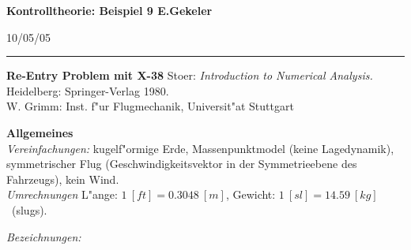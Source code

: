 \documentclass[12pt,a4paper,twoside,leqno]{article}
\newcommand{\Release}{10/05/05} %
\begin{document}
{\large\bf Kontrolltheorie: Beispiel 9 \hfill E.Gekeler}
\par
\vspace{-0.5ex}
\hfill{\footnotesize\Release\ }
\par\hrule\par\vspace{2ex}
\bc
{\bf Re-Entry Problem mit X-38}
\ec
{\sc Stoer:} {\sl Introduction to Numerical Analysis.}
Heidelberg: Springer-Verlag 1980.\\
{\sc W. Grimm:} Inst. f"ur Flugmechanik, Universit"at Stuttgart\\
\par\vspace{1ex}
{\bf Allgemeines}\\
{\em Vereinfachungen:} kugelf"ormige Erde, Massenpunktmodel (keine Lagedynamik),
symmetrischer Flug (Geschwindigkeitsvektor in der Symmetrieebene des Fahrzeugs),
kein Wind.\\
{\em Umrechnungen} L"ange: $1 \ [ft] = 0.3048 \ [m]$, Gewicht:
$1\ [sl]  =  14.59\ [kg] $ \ (slugs).
\par\vspace{0.5ex}
{\em Bezeichnungen:}
\renewcommand{\arraystretch}{1.2}
\bc
\par\vspace{-2ex}
\end{document}
